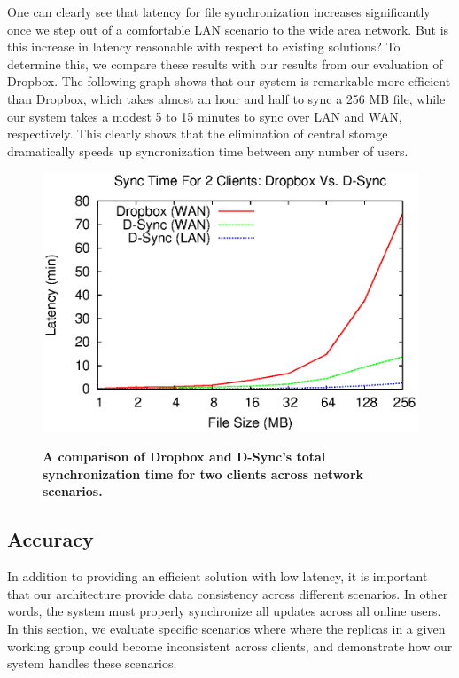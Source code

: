 One can clearly see that latency for file synchronization
increases significantly once we step out of a comfortable LAN
scenario to the wide area network.
But is this increase in latency reasonable with respect to existing solutions?
To determine this, we compare these results with our results
from our evaluation of Dropbox. The following graph shows that our system is
remarkable more efficient than Dropbox, which takes almost an hour and half to
sync a 256 MB file, while our system takes a modest 5 to 15 minutes to sync over
LAN and WAN, respectively. This clearly shows that the elimination of
central storage dramatically speeds up syncronization time between
any number of users.

\begin{figure}[h]
    \centering
    \includegraphics[scale=0.5]{figs/Dropbox_Performance.eps}
    \label{fig:dropbox}
    \caption{\textbf{A comparison of Dropbox and D-Sync's total synchronization time for two clients across network scenarios.}}
\end{figure}

\subsection{Accuracy}
\label{evaluation.accuracy}
In addition to providing an efficient solution with low latency,
it is important that our architecture provide data consistency across different
scenarios.
In other words, the system must properly synchronize
all updates across all online users.
In this section, we evaluate specific scenarios where
where the replicas in a given working group could become inconsistent across clients,
and demonstrate how our system handles these scenarios.

